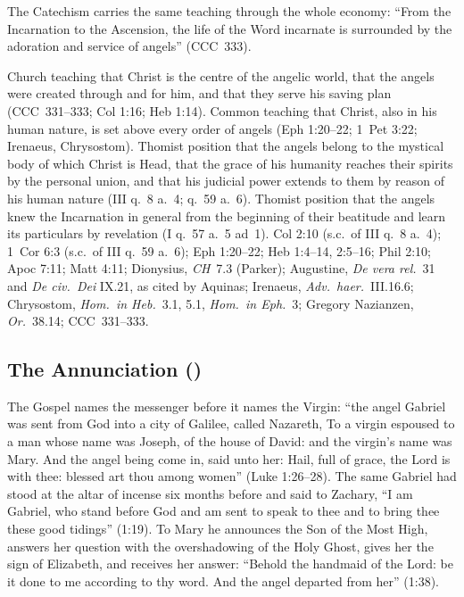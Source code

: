 The Catechism carries the same teaching through the whole economy: ``From
the Incarnation to the Ascension, the life of the Word incarnate is
surrounded by the adoration and service of angels'' (CCC~333).

 {Church teaching that Christ is the centre of the angelic world, that the
  angels were created through and for him, and that they serve his saving
  plan (CCC~331--333; Col 1:16; Heb 1:14). Common teaching that Christ,
  also in his human nature, is set above every order of angels (Eph
  1:20--22; 1~Pet 3:22; Irenaeus, Chrysostom). Thomist position that the
  angels belong to the mystical body of which Christ is Head, that the
  grace of his humanity reaches their spirits by the personal union, and
  that his judicial power extends to them by reason of his human nature
  (III q.~8 a.~4; q.~59 a.~6). Thomist position that the angels knew the
  Incarnation in general from the beginning of their beatitude and learn
  its particulars by revelation (I q.~57 a.~5 ad~1).}
 {Col 2:10 (s.c.\ of III q.~8 a.~4); 1~Cor 6:3 (s.c.\ of III q.~59 a.~6);
  Eph 1:20--22; Heb 1:4--14, 2:5--16; Phil 2:10; Apoc 7:11; Matt 4:11;
  Dionysius, \emph{CH}~7.3 (Parker); Augustine, \emph{De vera rel.}\ 31 and
  \emph{De civ.\ Dei} IX.21, as cited by Aquinas; Irenaeus, \emph{Adv.\
  haer.}\ III.16.6; Chrysostom, \emph{Hom.\ in Heb.}\ 3.1, 5.1, \emph{Hom.\
  in Eph.}\ 3; Gregory Nazianzen, \emph{Or.}\ 38.14; CCC~331--333.}

\sectionguard
\subsection{The Annunciation ()}\label{sec:cm-annunciation}

The Gospel names the messenger before it names the Virgin: ``the angel
Gabriel was sent from God into a city of Galilee, called Nazareth, To a
virgin espoused to a man whose name was Joseph, of the house of David: and
the virgin's name was Mary. And the angel being come in, said unto her:
Hail, full of grace, the Lord is with thee: blessed art thou among women''
(Luke 1:26--28). The same Gabriel had stood at the altar of incense six
months before and said to Zachary, ``I am Gabriel, who stand before God and
am sent to speak to thee and to bring thee these good tidings'' (1:19). To
Mary he announces the Son of the Most High, answers her question with the
overshadowing of the Holy Ghost, gives her the sign of Elizabeth, and
receives her answer: ``Behold the handmaid of the Lord: be it done to me
according to thy word. And the angel departed from her'' (1:38).

